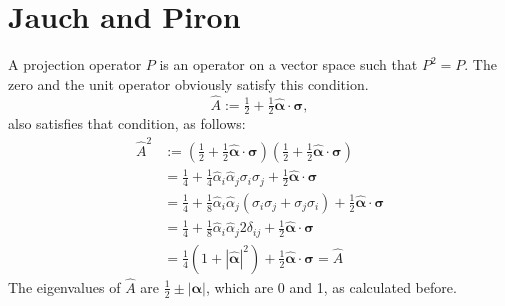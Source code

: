 \documentclass[12pt]{article}
\begin{document}
\section{Jauch and Piron}
A projection operator $P$ is an operator on a vector space such that
$P^2 = P$. The zero and the unit operator obviously satisfy this
condition.
\begin{displaymath}
  \hat{A}:= \tfrac{1}{2}+\tfrac{1}{2}\hat{\bm{\alpha}}\cdot\bm{\sigma},
\end{displaymath}
also satisfies that condition, as follows:
\begin{align*}
  \hat{A}^2&:= \left(\tfrac{1}{2}+\tfrac{1}{2}\hat{\bm{\alpha}}\cdot\bm{\sigma}\right)\left(\tfrac{1}{2}+\tfrac{1}{2}\hat{\bm{\alpha}}\cdot\bm{\sigma}\right)\\
  &=\tfrac{1}{4}+\tfrac{1}{4}\hat{\alpha}_i\hat{\alpha}_j\sigma_i\sigma_j+\tfrac{1}{2}\hat{\bm{\alpha}}\cdot\bm{\sigma}\\
  &=\tfrac{1}{4}+\tfrac{1}{8}\hat{\alpha}_i\hat{\alpha}_j(\sigma_i\sigma_j+\sigma_j\sigma_i)+\tfrac{1}{2}\hat{\bm{\alpha}}\cdot\bm{\sigma}\\
  &=\tfrac{1}{4}+\tfrac{1}{8}\hat{\alpha}_i\hat{\alpha}_j2\delta_{ij}+\tfrac{1}{2}\hat{\bm{\alpha}}\cdot\bm{\sigma}\\
  &=\tfrac{1}{4}(1+|\hat{\bm{\alpha}}|^2)+\tfrac{1}{2}\hat{\bm{\alpha}}\cdot\bm{\sigma}=\hat{A}
\end{align*}
The eigenvalues of $\hat{A}$ are $\tfrac{1}{2}\pm |\bm{\alpha}|$,
which are 0 and 1, as calculated before.





\end{document}

